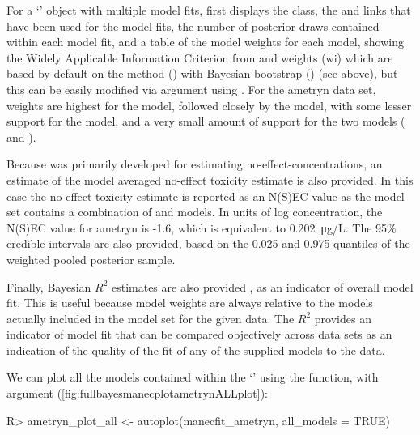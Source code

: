 \documentclass[
  shortnames]{jss}
\newcommand{\cls}[1]{`\code{#1}'}
\begin{document}
For a \cls{bayesmanecfit} object with multiple model fits,  first displays the class, the  and links that have been used for the model fits, the number of posterior draws contained within each model fit, and a table of the model weights for each model, showing the Widely Applicable Information Criterion \citep[waic,][]{watanabe2010asymptotic} from  and weights (wi) which are based by default on the  method () with Bayesian bootstrap () (see above), but this can be easily modified via argument  using . For the ametryn data set, weights are highest for the  model, followed closely by the  model, with some lesser support for the  model, and a very small amount of support for the two  models ( and ).

Because  was primarily developed for estimating no-effect-concentrations, an estimate of the model averaged no-effect toxicity estimate is also provided. In this case the no-effect toxicity estimate is reported as an N(S)EC value as the model set contains a combination of  and  models. In units of log concentration, the N(S)EC value for ametryn is -1.6, which is equivalent to \SI{0.202}{\micro\gram/\liter}. The 95\% credible intervals are also provided, based on the 0.025 and 0.975 quantiles of the weighted pooled posterior sample.

Finally, Bayesian \(R^2\) estimates are also provided \citep{gelman2019}, as an indicator of overall model fit. This is useful because model weights are always relative to the models actually included in the model set for the given data. The \(R^2\) provides an indicator of model fit that can be compared objectively across data sets as an indication of the quality of the fit of any of the supplied models to the data.

We can plot all the models contained within the \cls{bayesmanecfit} using the  function, with argument  (\autoref{fig:fullbayesmanecplotametrynALLplot}):

\begin{CodeChunk}
\begin{CodeInput}
R> ametryn_plot_all <- autoplot(manecfit_ametryn, all_models = TRUE)
\end{CodeInput}
\end{CodeChunk}
\end{document}
